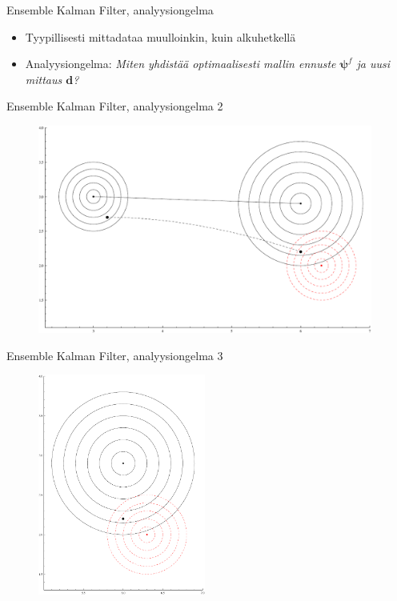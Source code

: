 \documentclass{beamer}
\begin{document}
\begin{frame}{Ensemble Kalman Filter, analyysiongelma}

\begin{itemize}
\item Tyypillisesti mittadataa muulloinkin, kuin alkuhetkellä
\item Analyysiongelma: \emph{Miten yhdistää optimaalisesti mallin ennuste $\boldsymbol{\psi}^f$ ja uusi mittaus $\boldsymbol{d}$?}
\end{itemize}

\end{frame}

\begin{frame}{Ensemble Kalman Filter, analyysiongelma 2}

\begin{figure}
\includegraphics[width=11cm]{enkf5.pdf}
\end{figure}

\end{frame}

\begin{frame}{Ensemble Kalman Filter, analyysiongelma 3}

\begin{figure}
\includegraphics[width=5.5cm]{enkf6.pdf}
\end{figure}

\end{frame}
\end{document}
